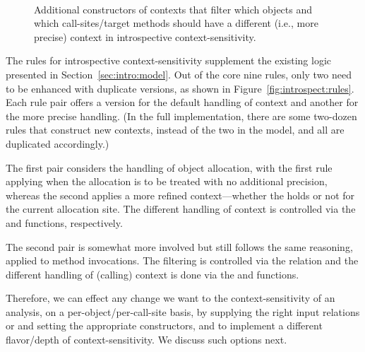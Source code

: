 \begin{figure}[htp]
\begin{datalog}
 \\
\end{datalog}
\caption[]{Additional constructors of contexts that filter which objects and which call-sites/target methods should have a different (i.e., more precise) context in introspective context-sensitivity.}
\label{fig:introspect:output}
\end{figure}

The rules for introspective context-sensitivity supplement the existing logic presented in Section~\ref{sec:intro:model}. Out of the core nine rules, only two need to be enhanced with duplicate versions, as shown in Figure~\ref{fig:introspect:rules}. Each rule pair offers a version for the default handling of context and another for the more precise handling. (In the full implementation, there are some two-dozen rules that construct new contexts, instead of the two in the model, and all are duplicated accordingly.)

The first pair considers the handling of object allocation, with the first rule applying when the allocation is to be treated with no additional precision, whereas the second applies a more refined context---whether the  holds or not for the current allocation site. The different handling of context is controlled via the  and  functions, respectively.

The second pair is somewhat more involved but still follows the same reasoning, applied to method invocations. The filtering is controlled via the  relation and the different handling of (calling) context is done via the  and  functions.

Therefore, we can effect any change we want to the context-sensitivity of an analysis, on a per-object/per-call-site basis, by supplying the right input relations  or  and setting the appropriate constructors,  and  to implement a different flavor/depth of context-sensitivity. We discuss such options next.

